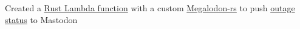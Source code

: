 {Created a \href{https://github.com/awslabs/aws-lambda-rust-runtime/tree/main}{Rust Lambda function} with a custom \href{https://github.com/sachiniyer/megalodon-rs-no-openssl}{Megalodon-rs} to push \href{https://botsin.space/@sachiniyerstatus}{outage status} to Mastodon}
